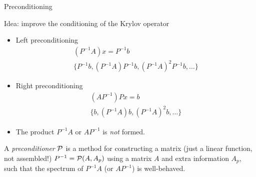 \begin{frame}{Preconditioning}
  \begin{block}{Idea: improve the conditioning of the Krylov operator}
    \begin{itemize}
    \item Left preconditioning
      \vspace{-1em}
      \begin{gather*}
        (P^{-1} A) x = P^{-1} b \\
        \{ P^{-1} b, (P^{-1}A) P^{-1} b, (P^{-1}A)^2 P^{-1} b, \dotsc \}
      \end{gather*}
    \item Right preconditioning
      \vspace{-1em}
      \begin{gather*}
        (A P^{-1}) P x = b \\
        \{ b, (P^{-1}A)b, (P^{-1}A)^2b, \dotsc \}
      \end{gather*}
    \item The product $P^{-1}A$ or $A P^{-1}$ is \emph{not} formed.
    \end{itemize}
  \end{block}
  \begin{definition}[Preconditioner]
      A \emph{preconditioner} $\mathcal{P}$ is a method for constructing a
matrix (just a linear function, not assembled!)  $P^{-1} = \mathcal{P}(A,A_p)$
using a matrix $A$ and extra information $A_p$, such that the spectrum
of $P^{-1}A$ (or $A P^{-1}$) is well-behaved.
    \end{definition}
\end{frame}
